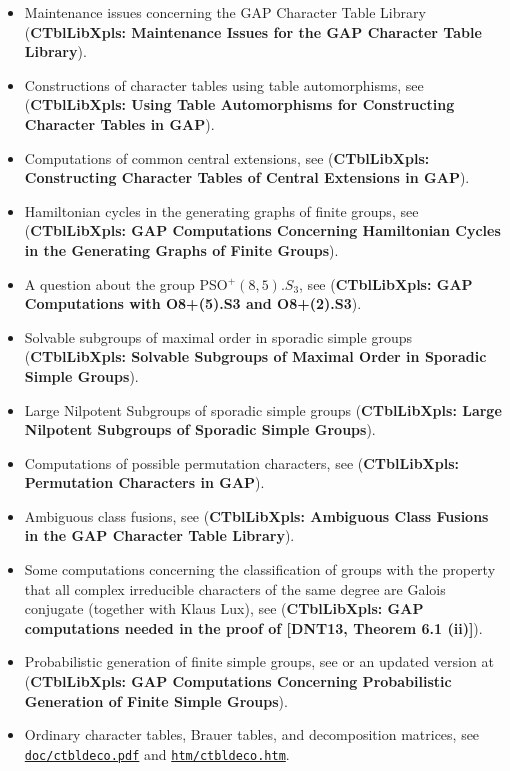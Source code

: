 \documentclass[a4paper,11pt]{report}
\begin{document}
{ 
\begin{itemize}
\item  Maintenance issues concerning the \textsf{GAP} Character Table Library  (\textbf{CTblLibXpls: Maintenance Issues for the GAP Character Table Library}). 
\item  Constructions of character tables using table automorphisms, see  (\textbf{CTblLibXpls: Using Table Automorphisms for Constructing Character Tables in GAP}). 
\item  Computations of common central extensions, see  (\textbf{CTblLibXpls: Constructing Character Tables of Central Extensions in GAP}). 
\item  Hamiltonian cycles in the generating graphs of finite groups, see  (\textbf{CTblLibXpls: GAP  Computations  Concerning  Hamiltonian  Cycles in the Generating Graphs of
Finite Groups}). 
\item  A question about the group PSO$^+(8,5).S_3$, see  (\textbf{CTblLibXpls: GAP Computations with O{\textunderscore}8\texttt{}+(5).S{\textunderscore}3 and O{\textunderscore}8\texttt{}+(2).S{\textunderscore}3}). 
\item  Solvable subgroups of maximal order in sporadic simple groups  (\textbf{CTblLibXpls: Solvable Subgroups of Maximal Order in Sporadic Simple Groups}). 
\item  Large Nilpotent Subgroups of sporadic simple groups  (\textbf{CTblLibXpls: Large Nilpotent Subgroups of Sporadic Simple Groups}). 
\item  Computations of possible permutation characters, see  (\textbf{CTblLibXpls: Permutation Characters in GAP}). 
\item  Ambiguous class fusions, see  (\textbf{CTblLibXpls: Ambiguous Class Fusions in the GAP Character Table Library}). 
\item  Some computations concerning the classification of groups with the property
that all complex irreducible characters of the same degree are Galois
conjugate (together with Klaus Lux), see  (\textbf{CTblLibXpls: GAP computations needed in the proof of [DNT13, Theorem 6.1 (ii)]}). 
\item  Probabilistic generation of finite simple groups, see \cite{ProbGenArxiv} or an updated version at  (\textbf{CTblLibXpls: GAP Computations Concerning Probabilistic Generation of Finite Simple Groups}). 
\item  Ordinary character tables, Brauer tables, and decomposition matrices, see \href{http://www.math.rwth-aachen.de/~Thomas.Breuer/ctbllib/doc/ctbldeco.pdf} {\texttt{doc/ctbldeco.pdf}} and \href{http://www.math.rwth-aachen.de/~Thomas.Breuer/ctbllib/htm/ctbldeco.htm} {\texttt{htm/ctbldeco.htm}}. 

\end{itemize}}
\end{document}
